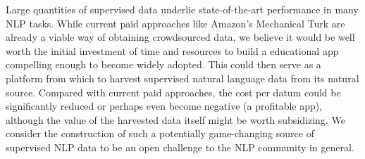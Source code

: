 Large quantities of supervised data underlie state-of-the-art performance in many NLP tasks.
While current paid approaches like Amazon's Mechanical Turk are already a viable way of obtaining crowdsourced data, we believe it would be well worth the initial investment of time and resources to build a educational app compelling enough to become widely adopted.
This could then serve as a platform from which to harvest supervised natural language data from its natural source. 
Compared with current paid approaches, the cost per datum could be significantly reduced or perhaps even become negative (a profitable app), although the value of the harvested data itself might be worth subsidizing.
We consider the construction of such a potentially game-changing source of supervised NLP data to be an open challenge to the NLP community in general.







%
%



